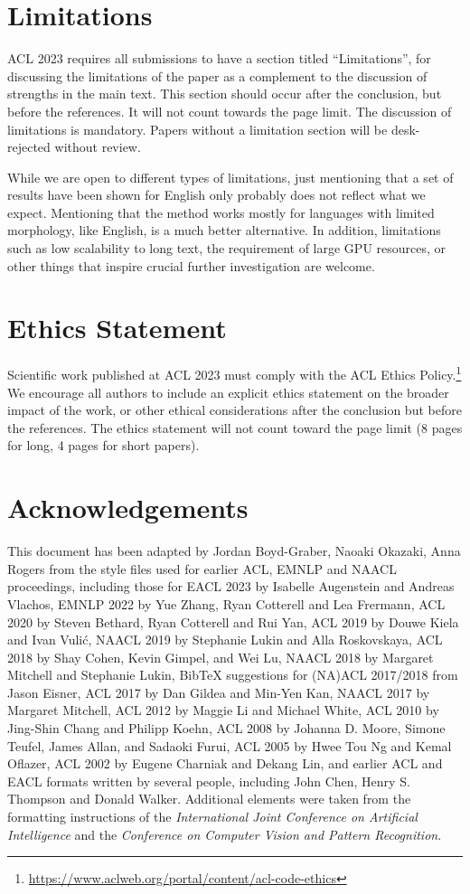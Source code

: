 \documentclass[11pt]{article}
\begin{document}
\section*{Limitations}
ACL 2023 requires all submissions to have a section titled ``Limitations'', for discussing the limitations of the paper as a complement to the discussion of strengths in the main text. This section should occur after the conclusion, but before the references. It will not count towards the page limit.
The discussion of limitations is mandatory. Papers without a limitation section will be desk-rejected without review.

While we are open to different types of limitations, just mentioning that a set of results have been shown for English only probably does not reflect what we expect. 
Mentioning that the method works mostly for languages with limited morphology, like English, is a much better alternative.
In addition, limitations such as low scalability to long text, the requirement of large GPU resources, or other things that inspire crucial further investigation are welcome.

\section*{Ethics Statement}
Scientific work published at ACL 2023 must comply with the ACL Ethics Policy.\footnote{\url{https://www.aclweb.org/portal/content/acl-code-ethics}} We encourage all authors to include an explicit ethics statement on the broader impact of the work, or other ethical considerations after the conclusion but before the references. The ethics statement will not count toward the page limit (8 pages for long, 4 pages for short papers).

\section*{Acknowledgements}
This document has been adapted by Jordan Boyd-Graber, Naoaki Okazaki, Anna Rogers from the style files used for earlier ACL, EMNLP and NAACL proceedings, including those for
EACL 2023 by Isabelle Augenstein and Andreas Vlachos,
EMNLP 2022 by Yue Zhang, Ryan Cotterell and Lea Frermann,
ACL 2020 by Steven Bethard, Ryan Cotterell and Rui Yan,
ACL 2019 by Douwe Kiela and Ivan Vuli\'{c},
NAACL 2019 by Stephanie Lukin and Alla Roskovskaya, 
ACL 2018 by Shay Cohen, Kevin Gimpel, and Wei Lu, 
NAACL 2018 by Margaret Mitchell and Stephanie Lukin,
Bib\TeX{} suggestions for (NA)ACL 2017/2018 from Jason Eisner,
ACL 2017 by Dan Gildea and Min-Yen Kan, NAACL 2017 by Margaret Mitchell, 
ACL 2012 by Maggie Li and Michael White, 
ACL 2010 by Jing-Shin Chang and Philipp Koehn, 
ACL 2008 by Johanna D. Moore, Simone Teufel, James Allan, and Sadaoki Furui, 
ACL 2005 by Hwee Tou Ng and Kemal Oflazer, 
ACL 2002 by Eugene Charniak and Dekang Lin, 
and earlier ACL and EACL formats written by several people, including
John Chen, Henry S. Thompson and Donald Walker.
Additional elements were taken from the formatting instructions of the \emph{International Joint Conference on Artificial Intelligence} and the \emph{Conference on Computer Vision and Pattern Recognition}.
\end{document}
